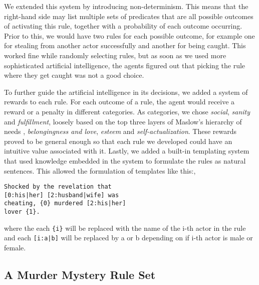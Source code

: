 We extended this system by introducing non-determinism. This means that the right-hand side may list multiple sets of predicates that are all possible outcomes of activating this rule, together with a probability of each outcome occurring. Prior to this, we would have two rules for each possible outcome, for example one for stealing from another actor successfully and another for being caught. This worked fine while randomly selecting rules, but as soon as we used more sophisticated artificial intelligence, the agents figured out that picking the rule where they get caught was not a good choice.

To further guide the artificial intelligence in its decisions, we added a system of rewards to each rule. For each outcome of a rule, the agent would receive a reward or a penalty in different categories.
As categories, we chose \emph{social}, \emph{sanity} and \emph{fulfillment}, loosely based on the top three layers of Maslow's hierarchy of needs , \emph{belongingness and love}, \emph{esteem} and \emph{self-actualization}.
These rewards proved to be general enough so that each rule we developed could have an intuitive value associated with it.
Lastly, we added a built-in templating system that used knowledge embedded in the system to formulate the rules as natural sentences.
This allowed the formulation of templates like this:,
\begin{lstlisting}
Shocked by the revelation that
[0:his|her] [2:husband|wife] was
cheating, {0} murdered [2:his|her]
lover {1}.
\end{lstlisting}
where the each \lstinline|{i}| will be replaced with the name of the i-th actor in the rule and each \lstinline{[i:a|b]} will be replaced by a or b depending on if i-th actor is male or female.

\subsection{A Murder Mystery Rule Set}

